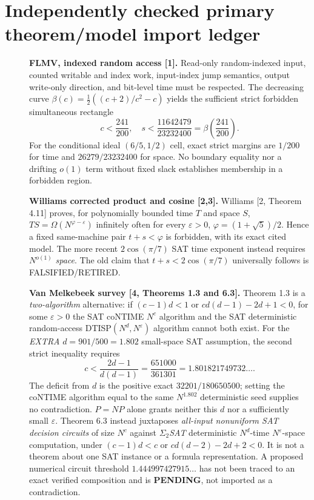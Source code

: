 \documentclass[11pt]{article}
\begin{document}
\section{Independently checked primary theorem/model import ledger}
\begin{description}
\item[] \textbf{FLMV, indexed random access [1].}
Read-only random-indexed input, counted writable and index work,
input-index jump semantics, output write-only direction, and bit-level
time must be respected. The decreasing curve
$\beta(c)=\tfrac12((c+2)/c^2-c)$ yields the sufficient
strict forbidden simultaneous rectangle
\[
 c<\frac{241}{200},\quad
 s<\frac{11642479}{23232400}
 =\beta\!\left(\frac{241}{200}\right).
 \tag{4}
\]
For the conditional ideal $(6/5,1/2)$ cell, exact strict margins are
$1/200$ for time and $26279/23232400$ for space.
No boundary equality nor a drifting $o(1)$ term without fixed slack
establishes membership in a forbidden region.

\item[] \textbf{Williams corrected product and cosine [2,3].}
Williams [2, Theorem 4.11] proves, for polynomially bounded
time $T$ and space $S$, $TS=\Omega(N^{\varphi-\varepsilon})$
infinitely often for every $\varepsilon>0$,
$\varphi=(1+\sqrt5)/2$. Hence a fixed same-machine pair
$t+s<\varphi$ is forbidden, with its exact cited model.
The more recent $2\cos(\pi/7)$ SAT time exponent instead
requires $N^{o(1)}$ \emph{space}. The old claim that
$t+s<2\cos(\pi/7)$ universally follows is FALSIFIED/RETIRED.

\item[] \textbf{Van Melkebeek survey [4, Theorems 1.3 and 6.3].}
Theorem 1.3 is a \emph{two-algorithm} alternative:
if $(c-1)d<1$ or $cd(d-1)-2d+1<0$, for some
$\varepsilon>0$ the SAT coNTIME $N^c$ algorithm and
the SAT deterministic random-access
DTISP$(N^d,N^\varepsilon)$ algorithm cannot both exist.
For the \emph{EXTRA} $d=901/500=1.802$ small-space SAT
assumption, the second strict inequality requires
\[
 c<\frac{2d-1}{d(d-1)}
 =\frac{651000}{361301}
 =1.801821749732\ldots. \tag{5}
\]
The deficit from $d$ is the positive exact
$32201/180650500$; setting the coNTIME algorithm equal
to the same $N^{1.802}$ deterministic seed supplies
no contradiction. $P=NP$ alone grants neither this $d$
nor a sufficiently small $\varepsilon$.
Theorem 6.3 instead juxtaposes \emph{all-input nonuniform
SAT decision circuits} of size $N^c$ against
\emph{$\Sigma_2$SAT} deterministic $N^d$-time
$N^\varepsilon$-space computation, under
$(c-1)d<c$ or $cd(d-2)-2d+2<0$.
It is not a theorem about one SAT instance or a
formula representation. A proposed numerical circuit
threshold $1.444997427915\ldots$ has not been traced to
an exact verified composition and is \textbf{PENDING}, not
imported as a contradiction.


\end{description}
\end{document}
